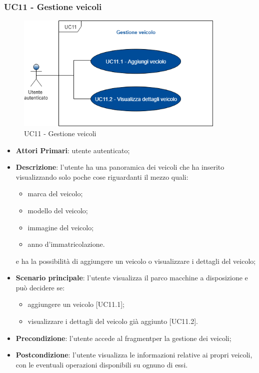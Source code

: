  \subsubsection{UC11 - Gestione veicoli}
  \begin{figure}[H]
 	\includegraphics[width=10cm]{res/images/UC10Gestioneveicolo.png}
 	\centering
 	\caption{UC11 - Gestione veicoli}
 \end{figure}
 \begin{itemize}
 	\item \textbf{Attori Primari}: utente autenticato;
 	\item \textbf{Descrizione}: l'utente ha una panoramica dei veicoli che ha inserito visualizzando solo poche cose riguardanti il mezzo quali:
 	\begin{itemize}
 		\item marca del veicolo;
 		\item modello del veicolo;
 		\item immagine del veicolo;
 		\item anno d'immatricolazione.
 	\end{itemize} 
 	e ha la possibilità di aggiungere un veicolo o visualizzare i dettagli del veicolo;
 	\item \textbf{Scenario principale}: l'utente visualizza il parco macchine a disposizione e può decidere se:
 	\begin{itemize}
 		\item aggiungere un veicolo [UC11.1];
 		\item visualizzare i dettagli del veicolo già aggiunto [UC11.2].
 	\end{itemize}
 	\item \textbf{Precondizione}: l'utente accede al fragment\glosp per la gestione dei veicoli;
 	\item \textbf{Postcondizione}: l'utente visualizza le informazioni relative ai propri veicoli, con le eventuali operazioni disponibili su ognuno di essi.
 \end{itemize}
